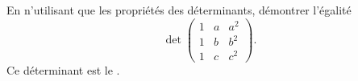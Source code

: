 

\begin{exercice}\label{exoINGE1121La0007}

	En n'utilisant que les propriétés des déterminants, démontrer l'égalité
	\begin{equation}
		\det\begin{pmatrix}
			1	&	a	&	a^2	\\
			1	&	b	&	b^2	\\
			1	&	c	&	c^2
		\end{pmatrix}.
	\end{equation}
	Ce déterminant est le .

\end{exercice}
